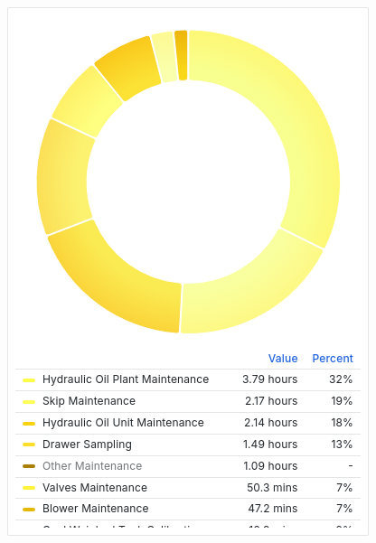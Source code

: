 \documentclass{article}
\begin{document}
\includegraphics[width=\textwidth]{panel_0019-0014.png}
\end{document}
